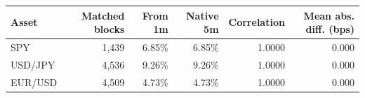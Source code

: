 \begin{tabular}{lrrrrr}
\toprule
Asset & Matched blocks & From 1m & Native 5m & Correlation & Mean abs. diff. (bps) \\
\midrule
SPY & 1,439 & 6.85\% & 6.85\% & 1.0000 & 0.000 \\
USD/JPY & 4,536 & 9.26\% & 9.26\% & 1.0000 & 0.000 \\
EUR/USD & 4,509 & 4.73\% & 4.73\% & 1.0000 & 0.000 \\
\bottomrule
\end{tabular}
